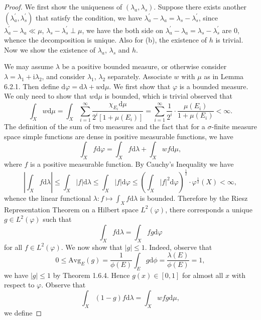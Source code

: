 \begin{proof}
We first show the uniqueness of $(\lambda_a,\lambda_s)$. Suppose there exists another $(\lambda_a^\prime,\lambda_s^\prime)$ that satisfy the condition, we have $\lambda_a^\prime-\lambda_a=\lambda_s-\lambda_s^\prime$, since $\lambda_a^\prime-\lambda_a\ll\mu$, $\lambda_s-\lambda_s^\prime\perp\mu$, we have the both side on $\lambda_a^\prime-\lambda_a=\lambda_s-\lambda_s^\prime$ are $0$, whence the decomposition is unique. Also for (b), the existence of $h$ is trivial. Now we show the existence of $\lambda_a$, $\lambda_s$ and $h$.\par
We may assume $\lambda$ be a positive bounded measure, or otherwise consider $\lambda=\lambda_1+\mathrm{i}\lambda_2$, and consider $\lambda_1$, $\lambda_2$ separately. Associate $w$ with $\mu$ as in Lemma 6.2.1. Then define $\mathrm{d}\varphi=\mathrm{d}\lambda+w\mathrm{d}\mu$. We first show that $\varphi$ is a bounded measure. We only need to show that $w\mathrm{d}\mu$ is bounded, which is trivial observed that 
$$
\int_X{w\mathrm{d}\mu}=\int_X{\sum_{i=1}^{\infty}{\frac{\chi _{E_i}\mathrm{d}\mu}{2^i\left[ 1+\mu \left( E_i \right) \right]}}}=\sum_{i=1}^{\infty}{\frac{1}{2^i}\cdot \frac{\mu \left( E_i \right)}{1+\mu \left( E_i \right)}}<\infty .
$$
The definition of the sum of two measures and the fact that for a $\sigma$-finite measure space simple functions are dense in positive measurable functions, we have 
$$
\int_X{f\mathrm{d}\varphi}=\int_X{f\mathrm{d}\lambda}+\int_X{wf\mathrm{d}\mu},
$$
where $f$ is a positive measurable function. By Cauchy's Inequality we have 
$$
\left| \int_X{f\mathrm{d}\lambda} \right|\le \int_X{\left| f \right|\mathrm{d}\lambda}\le \int_X{\left| f \right|\mathrm{d}\varphi}\le \left( \int_X{\left| f \right|^2\mathrm{d}\varphi} \right) ^{\frac{1}{2}}\cdot \varphi ^{\frac{1}{2}}\left( X \right) <\infty ,
$$
whence the linear functional $\lambda:f\mapsto\int_Xf\mathrm{d}\lambda$ is bounded. Therefore by the Riesz Representation Theorem on a Hilbert space $L^2(\varphi)$, there corresponds a unique $g\in L^2(\varphi)$ such that 
$$
\int_X{f\mathrm{d}\lambda}=\int_X{fg\mathrm{d}\varphi}
$$
for all $f\in L^2(\varphi)$. We now show that $|g|\le 1$. Indeed, observe that 
$$
0\le \mathrm{Avg}_E\left( g \right) =\frac{1}{\phi \left( E \right)}\int_E{g\mathrm{d}\phi}=\frac{\lambda \left( E \right)}{\phi \left( E \right)}=1,
$$
we have $|g|\le 1$ by Theorem 1.6.4. Hence $g(x)\in[0,1]$ for almost all $x$ with respect to $\varphi$. Observe that 
$$
\int_X{\left( 1-g \right) f\mathrm{d}\lambda}=\int_X{wfg\mathrm{d}\mu},
$$
we define 

\end{proof}

